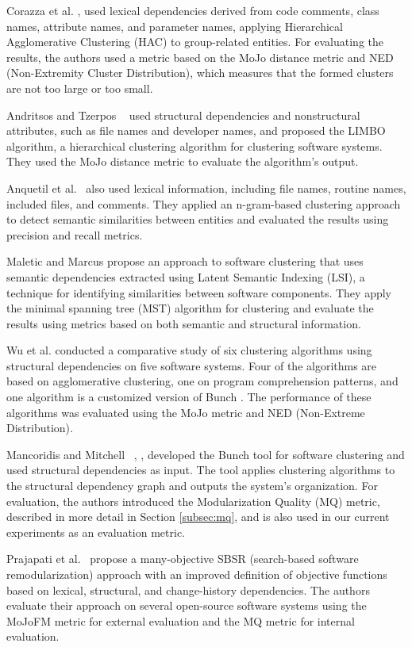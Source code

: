 \documentclass{ieeeaccess}
\begin{document}
Corazza et al. \cite{b13}, \cite{corazza2} used lexical dependencies derived from code comments, class names, attribute names, and parameter names, applying Hierarchical Agglomerative Clustering (HAC) to group-related entities. For evaluating the results, the authors used a metric based on the MoJo distance metric and NED (Non-Extremity Cluster Distribution), which measures that the formed clusters are not too large or too small.

Andritsos and Tzerpos ~\cite{tzerpos1} used structural dependencies and nonstructural attributes, such as file names and developer names, and proposed the LIMBO algorithm, a hierarchical clustering algorithm for clustering software systems. They used the MoJo distance metric to evaluate the algorithm's output.

Anquetil et al.~\cite{b14} also used lexical information, including file names, routine names, included files, and comments. They applied an n-gram-based clustering approach to detect semantic similarities between entities and evaluated the results using precision and recall metrics.

Maletic and Marcus \cite{maletic} propose an approach to software clustering that uses semantic dependencies extracted using Latent Semantic Indexing (LSI), a technique for identifying similarities between software components. They apply the minimal spanning tree (MST) algorithm for clustering and evaluate the results using metrics based on both semantic and structural information.

Wu et al. \cite{wu} conducted a comparative study of six clustering algorithms using structural dependencies on five software systems. Four of the algorithms are based on agglomerative clustering, one on program comprehension patterns, and one algorithm is a customized version of Bunch \cite{b10}. The performance of these algorithms was evaluated using the MoJo metric and NED (Non-Extreme Distribution).

Mancoridis and Mitchell ~\cite{b10}, \cite{b101}, \cite{bunch} developed the Bunch tool for software clustering and used structural dependencies as input. The tool applies clustering algorithms to the structural dependency graph and outputs the system's organization. For evaluation, the authors introduced the Modularization Quality (MQ) metric, described in more detail in Section \ref{subsec:mq}, and is also used in our current experiments as an evaluation metric.

Prajapati et al.~\cite{b18} propose a many-objective SBSR (search-based software remodularization) approach with an improved definition of objective functions based on lexical, structural, and change-history dependencies. The authors evaluate their approach on several open-source software systems using the MoJoFM metric for external evaluation and the MQ metric for internal evaluation.
\end{document}
